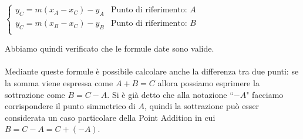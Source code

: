 \documentclass[a4paper,12pt]{tesiinfo}
\begin{document}
\begin{center}$
 \begin{cases}
  y_C = m(x_A-x_C)-y_A & \text{Punto di riferimento: }A\\
  y_C = m(x_B-x_C)-y_B & \text{Punto di riferimento: }B\\
 \end{cases}$
\end{center}
Abbiamo quindi verificato che le formule date sono valide.
\\
\\
Mediante queste formule \`e possibile calcolare anche la differenza tra due punti: se la somma viene espressa come $A+B=C$ allora possiamo esprimere la sottrazione come $B=C-A$. Si \`e gi\`a detto che alla notazione ``$-A$" facciamo corrispondere il punto simmetrico di $A$, quindi la sottrazione pu\`o esser considerata un caso particolare della Point Addition in cui $B=C-A = C + (-A)$.
\end{document}
